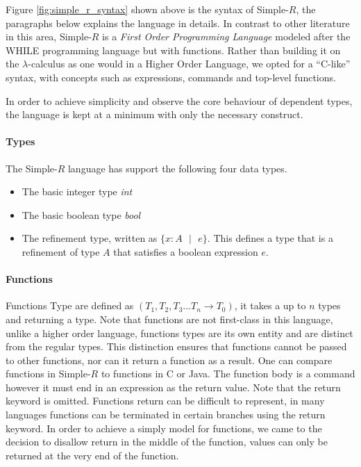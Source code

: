 \documentclass[a4paper,12pt]{report}
\begin{document}
\par
Figure \ref{fig:simple_r_syntax} shown above is the syntax of Simple-$R$, the paragraphs below 
explains the language in details. In contrast to other literature in this area, 
Simple-$R$ is a \textit{First Order Programming Language} \cite{FOL} modeled 
after the WHILE \cite{whileLanguage} programming language but with functions.
Rather than building it on the $\lambda$-calculus as one would in 
a Higher Order Language, we opted for a ``C-like'' syntax, with concepts such as 
expressions, commands and top-level functions.

\par
In order to achieve simplicity and observe the core behaviour of dependent 
types, the language is kept at a minimum with only the necessary construct. 

\paragraph{Types} The Simple-$R$ language has support the following four data types. 
\begin{itemize}
  \item The basic integer type \textit{int}
  \item The basic boolean type \textit{bool}
  \item The refinement type, written as $\{x: A\text{ }|\text{ }e\}$. This defines 
  a type that is a refinement of type $A$ that satisfies a boolean expression $e$.
\end{itemize}

\paragraph{Functions}
Functions Type are defined as $(T_1, T_2,T_3...T_n \longrightarrow T_0)$, 
it takes a up to $n$ types and returning a type. Note that functions are 
not first-class in this language, unlike a higher order 
language, functions types are its own entity and are distinct from the regular 
types. This distinction ensures that functions cannot be passed to 
other functions, nor can it return a function as a result. One can compare 
functions in Simple-$R$ to functions in C or Java. The function body is a 
command however it must end in an expression as the return value. Note that the 
return keyword is omitted. Functions return can be difficult to represent, in many 
languages functions can be terminated in certain branches using the 
return keyword. In order to achieve a simply model for functions, we came to 
the decision to disallow return in the middle of the function, values can 
only be returned at the very end of the function.
\end{document}
